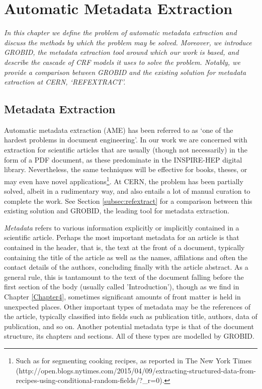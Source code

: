 
\chapter{Automatic Metadata Extraction} %

\label{Chapter3} %



\emph{In this chapter we define the problem of automatic metadata extraction and discuss the methods by which the problem may be solved. Moreover, we introduce GROBID, the metadata extraction tool around which our work is based, and describe the cascade of CRF models it uses to solve the problem. Notably, we provide a comparison between GROBID and the existing solution for metadata extraction at CERN, `REFEXTRACT'.}

\section{Metadata Extraction}

Automatic metadata extraction (AME) has been referred to as `one of the hardest problems in document engineering'. In our work we are concerned with extraction for scientific articles that are usually (though not necessarily) in the form of a PDF document, as these predominate in the INSPIRE-HEP digital library. Nevertheless, the same techniques will be effective for books, theses, or may even have novel applications\footnote{Such as for segmenting cooking recipes, as reported in The New York Times (http://open.blogs.nytimes.com/2015/04/09/extracting-structured-data-from-recipes-using-conditional-random-fields/?\_r=0).}. At CERN, the problem has been partially solved, albeit in a rudimentary way, and also entails a lot of manual curation to complete the work. See Section \ref{subsec:refextract} for a comparison between this existing solution and GROBID, the leading tool for metadata extraction.

\emph{Metadata} refers to various information explicitly or implicitly contained in a scientific article. Perhaps the most important metadata for an article is that contained in the header, that is, the text at the front of a document, typically containing the title of the article as well as the names, affilations and often the contact details of the authors, concluding finally with the article abstract. As a general rule, this is tantamount to the text of the document falling before the first section of the body (usually called 'Introduction'), though as we find in Chapter \ref{Chapter4}, sometimes significant amounts of front matter is held in unexpected places. Other important types of metadata may be the references of the article, typically classified into fields such as publication title, authors, data of publication, and so on. Another potential metadata type is that of the document structure, its chapters and sections. All of these types are modelled by GROBID.

